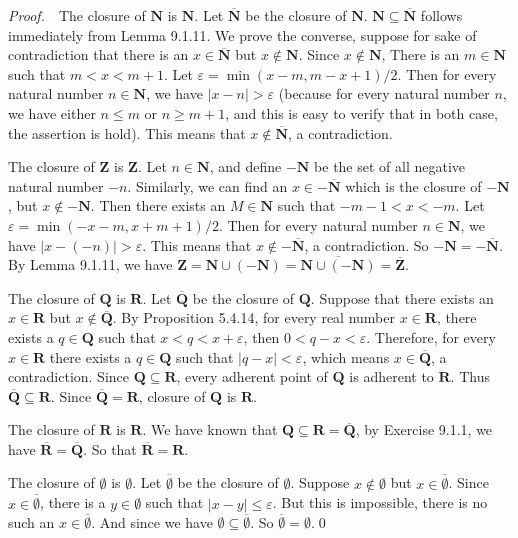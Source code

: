 \documentclass{book}
\newcommand{\pff}{\vspace{.25em}\noindent\emph{Proof.}~~}
\newcounter{Exercise}[section]
\begin{document}
\pff The closure of $\mathbf{N}$ is $\mathbf{N}$. Let $\overline{\mathbf{N}}$ be the closure of $\mathbf{N}$. $\mathbf{N}\subseteq\overline{\mathbf{N}}$ follows immediately from Lemma 9.1.11. We prove the converse, suppose for sake of contradiction that there is an $x\in\overline{\mathbf{N}}$ but $x\notin\mathbf{N}$. Since $x\notin\mathbf{N}$, There is an $m\in\mathbf{N}$ such that $m<x<m+1$. Let $\varepsilon=\min(x-m,m-x+1)/2$. Then for every natural number $n\in\mathbf{N}$, we have $|x-n|>\varepsilon$ (because for every natural number $n$, we have either $n\leq m$ or $n\geq m+1$, and this is easy to verify that in both case, the assertion is hold). This means that $x\notin\overline{\mathbf{N}}$, a contradiction.

The closure of $\mathbf{Z}$ is $\mathbf{Z}$. Let $n\in\mathbf{N}$, and define $-\mathbf{N}$ be the set of all negative natural number $-n$. Similarly, we can find an $x\in-\overline{\mathbf{N}}$ which is the closure of $-\mathbf{N}$, but $x\notin-\mathbf{N}$. Then there exists an $M\in\mathbf{N}$ such that $-m-1<x<-m$. Let $\varepsilon=\min(-x-m,x+m+1)/2$. Then for every natural number $n\in\mathbf{N}$, we have $|x-(-n)|>\varepsilon$. This means that $x\notin-\overline{\mathbf{N}}$, a contradiction. So $-\mathbf{N}=-\overline{\mathbf{N}}$. By Lemma 9.1.11, we have $\mathbf{Z}=\mathbf{N}\cup(-\mathbf{N})=\overline{\mathbf{N}\cup(-\mathbf{N})}=\overline{\mathbf{Z}}$.

The closure of $\mathbf{Q}$ is $\mathbf{R}$. Let $\overline{\mathbf{Q}}$ be the closure of $\mathbf{Q}$. Suppose that there exists an $x\in\mathbf{R}$ but $x\notin\overline{\mathbf{Q}}$. By Proposition 5.4.14, for every real number $x\in\mathbf{R}$, there exists a $q\in\mathbf{Q}$ such that $x<q<x+\varepsilon$, then $0<q-x<\varepsilon$. Therefore, for every $x\in\mathbf{R}$ there exists a $q\in\mathbf{Q}$ such that $|q-x|<\varepsilon$, which means $x\in\overline{\mathbf{Q}}$, a contradiction. Since $\mathbf{Q}\subseteq\mathbf{R}$, every adherent point of $\mathbf{Q}$ is adherent to $\mathbf{R}$. Thus $\overline{\mathbf{Q}}\subseteq\mathbf{R}$. Since $\overline{\mathbf{Q}}=\mathbf{R}$, closure of $\mathbf{Q}$ is $\mathbf{R}$.

The closure of $\mathbf{R}$ is $\mathbf{R}$. We have known that $\mathbf{Q}\subseteq\mathbf{R}=\overline{\mathbf{Q}}$, by Exercise 9.1.1, we have $\overline{\mathbf{R}}=\overline{\mathbf{Q}}$. So that $\overline{\mathbf{R}}=\mathbf{R}$.

The closure of $\emptyset$ is $\emptyset$. Let $\overline\emptyset$ be the closure of $\emptyset$. Suppose $x\notin\emptyset$ but $x\in\overline\emptyset$. Since $x\in\overline\emptyset$, there is a $y\in\emptyset$ such that $|x-y|\leq\varepsilon$. But this is impossible, there is no such an $x\in\overline\emptyset$. And since we have $\emptyset\subseteq\overline\emptyset$. So $\overline\emptyset=\emptyset$.\qed
\end{document}
